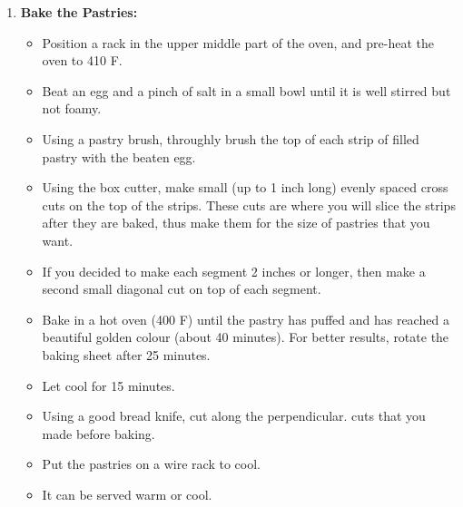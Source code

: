 \documentclass[11pt,letterpaper]{article}
\newcommand \fileName {Pastelao}
\begin{document}
\begin{description}
\begin{enumerate}
\item{\bf Bake the Pastries:}
        \begin{itemize}
        \item Position a rack in the upper middle part of the oven,
        and pre-heat the oven to 410 F.
        \item Beat an egg and a pinch of salt in a small bowl until it
        is well stirred but not foamy.
        \item Using a pastry brush, throughly brush the top of each
        strip of filled pastry with the beaten egg.
        \item Using the box cutter, make small (up to 1 inch long)
        evenly spaced cross cuts on the top of the strips. These cuts are
        where you will slice the strips after they are baked, thus
        make them for the size of pastries that you want.
        \item If you decided to make each segment 2 inches or longer,
        then make a second small diagonal cut on top of each segment.
        \item Bake in a hot oven (400 F) until the pastry has puffed and has
        reached a beautiful golden colour (about 40 minutes). For better results, rotate the baking sheet after 25 minutes.
        \item Let cool for 15 minutes.
        \item Using a good bread knife, cut along the perpendicular.
        cuts that you made before baking.
        \item Put the pastries on a wire rack to cool.
        \item It can be served warm or cool.
        \end{itemize}
        \end{enumerate}
\end{description}


\end{document}
